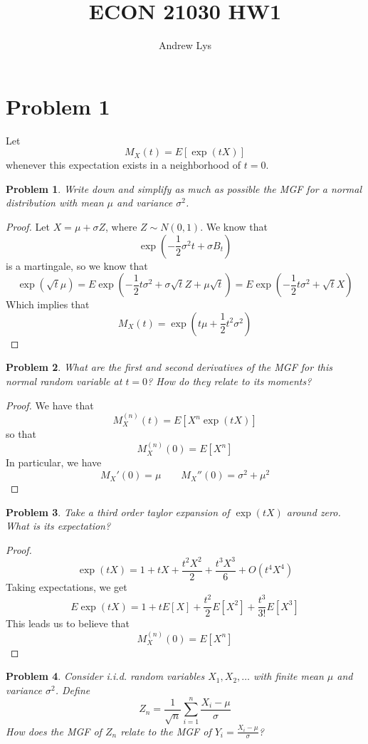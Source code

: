 \documentclass{amsart}
\title{ECON 21030 HW1}
\author{Andrew Lys}
\newtheorem{theorem}{Problem}[section]
\begin{document}
\maketitle
\section{Problem 1}
Let 
\[
M_X(t) = E[\exp(tX)]
\]
whenever this expectation exists in a neighborhood of $t = 0$.
\begin{theorem}
    Write down and simplify as much as possible the MGF for a normal distribution with mean $\mu$ and variance $\sigma^2$. 
\end{theorem}
\begin{proof}
   Let $X = \mu + \sigma Z$, where $Z \sim N(0, 1)$. 
   We know that 
   \[
   \exp\left(
    -\frac12 \sigma^2t + \sigma B_t
   \right)
   \] 
   is a martingale, so we know that 
   \[
   \exp(\sqrt{t}\mu) = E\exp\left(
    -\frac12 t \sigma^2 + \sigma \sqrt{t} Z + \mu \sqrt{t}
   \right) = E \exp\left(
    -\frac12 t \sigma^2 + \sqrt{t} X
   \right)
   \]
   Which implies that
   \[
   M_X(t) = \exp\left(
    t \mu + \frac12 t^2 \sigma^2
   \right)
   \]
\end{proof}
\begin{theorem}
    What are the first and second derivatives of the MGF for this normal random variable at $t = 0$? 
    How do they relate to its moments? 
\end{theorem}
\begin{proof}
    We have that 
    \[
    M_X^{(n)}(t) = E[X^n \exp(tX)]
    \]
    so that 
    \[
    M_X^{(n)}(0) = E[X^n]
    \]
    In particular, we have 
    \[
    M_X'(0) = \mu \qquad M_X''(0) = \sigma^2 + \mu^2
    \]
\end{proof}
\begin{theorem}
    Take a third order taylor expansion of $\exp(tX)$ around zero. 
    What is its expectation? 
\end{theorem}
\begin{proof}
    \[
    \exp(tX) = 1 + tX + \frac{t^2 X^2}{2} + \frac{t^3 X^3}{6} + O(t^4X^4)
    \]
    Taking expectations, we get
    \[
    E\exp(tX) = 1 + t E[X] + \frac{t^2}{2} E[X^2] + \frac{t^3}{3!} E[X^3]
    \]
    This leads us to believe that 
    \[
    M_X^{(n)}(0) = E[X^n]
    \]
\end{proof}
\begin{theorem}
    Consider i.i.d. random variables $X_1, X_2, \ldots$ with finite mean $\mu$ and variance $\sigma^2$.
    Define 
    \[
    Z_n = \frac{1}{\sqrt{n}} \sum_{i = 1}^n \frac{X_i - \mu}{\sigma}
    \]
    How does the MGF of $Z_n$ relate to the MGF of $Y_i = \frac{X_i - \mu}{\sigma}$?
\end{theorem}
\end{document}
